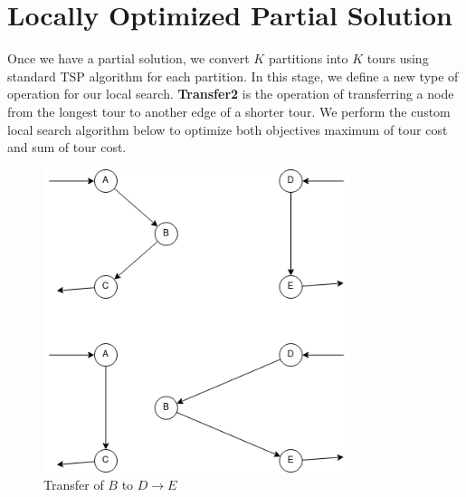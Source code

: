 \section{Locally Optimized Partial Solution}

Once we have a partial solution, we convert $K$ partitions into $K$ tours using standard TSP algorithm for each partition. In this stage, we define a new type of operation for our local search. \textbf{Transfer2} is the operation of transferring a node from the longest tour to another edge of a shorter tour. We perform the custom local search algorithm below to optimize both objectives maximum of tour cost and sum of tour cost.

\begin{figure}[h!]
\centering
\includegraphics[width=0.8\textwidth]{assets/transfer2.png}
\caption{Transfer of $B$ to $D \to E$}
\label{fig:transfer2}
\end{figure}


